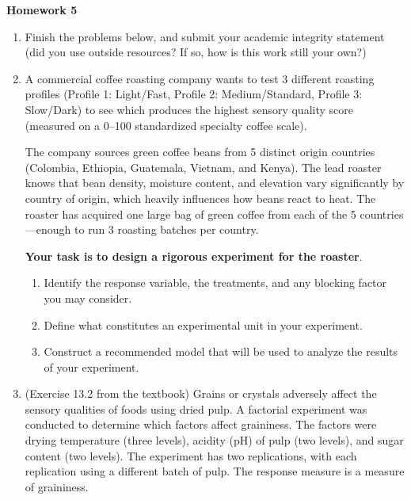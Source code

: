 \documentclass[10pt,twoside]{article}\usepackage[]{graphicx}\usepackage[dvipsnames,svgnames,table]{xcolor}
\begin{document}
\begin{flushright}
\begin{minipage}{.33\textwidth}
\rightline{\today}
\end{minipage}
\end{flushright}

\begin{center}
{\large{\textbf{Homework 5}}}
\end{center}

\begin{enumerate}
  
  \item Finish the problems below, and submit your academic integrity statement (did you use outside resources? If so, how is this work still your own?)

 \item A commercial coffee roasting company wants to test 3 different roasting profiles (Profile 1: Light/Fast, Profile 2: Medium/Standard, Profile 3: Slow/Dark) to see which produces the highest sensory quality score (measured on a 0–100 standardized specialty coffee scale).
  
  The company sources green coffee beans from 5 distinct origin countries (Colombia, Ethiopia, Guatemala, Vietnam, and Kenya). The lead roaster knows that bean density, moisture content, and elevation vary significantly by country of origin, which heavily influences how beans react to heat. The roaster has acquired one large bag of green coffee from each of the 5 countries---enough to run 3 roasting batches per country.
  
  \textbf{Your task is to design a rigorous experiment for the roaster}.
  
  \begin{enumerate}
    \item Identify the response variable, the treatments, and any blocking factor you may consider.
    \item Define what constitutes an experimental unit in your experiment. 
    \item Construct a recommended model that will be used to analyze the results of your experiment.
  \end{enumerate}

 
  \item (Exercise 13.2 from the textbook) Grains or crystals adversely affect the sensory qualities of foods using dried pulp. A factorial experiment was conducted to determine which factors affect graininess. The factors were drying temperature (three levels), acidity (pH) of pulp (two levels), and sugar content (two levels). The experiment has two replications, with each replication using a different batch of pulp. The response measure is a measure of graininess.
  

\end{enumerate}
\end{document}
